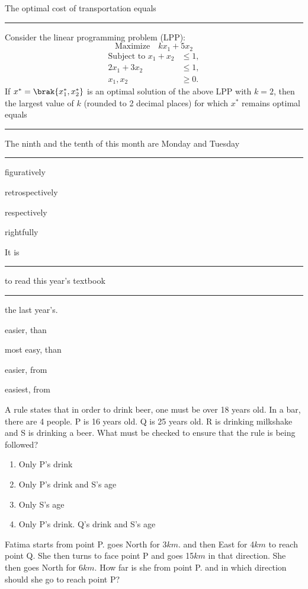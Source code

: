 The optimal cost of transportation equals \rule{2cm}{0.15mm}
\item Consider the linear programming problem (LPP):
\[
\text{Maximize} \quad kx_1 + 5x_2
\]
\[
\begin{aligned}
    \text{Subject to } x_1 + x_2 &\leq 1,\\
    2x_1 + 3x_2 &\leq 1, \\
    x_1, x_2 &\geq 0.
\end{aligned}
\]
If $x^*=\brak{x^*_1,x^*_2}$ is an optimal solution of the above LPP with $k=2$, then the largest value of $k$ (rounded to 2 decimal places) for which $x^*$ remains optimal equals \rule{2cm}{0.15mm} 
\item  The ninth and the tenth of this month are Monday and Tuesday \rule{2cm}{0.15mm}
\begin{enumerate}
\begin{multicols}{4}
\item figuratively
\item retrospectively
\item respectively
\item rightfully
\end{multicols}
\end{enumerate}
\item It is \rule{2cm}{0.15mm} to read this year's textbook \rule{2cm}{0.15mm} the last year's.
\begin{enumerate}
\begin{multicols}{4}
\item easier, than
\item most easy, than
\item easier, from
\item easiest, from
\end{multicols}
\end{enumerate}
\item A rule states that in order to drink beer, one must be over 18 years old. In a bar, there are 4 people. P is 16 years old. Q is 25 years old. R is drinking milkshake and S is drinking a beer. What must be checked to ensure that the rule is being followed?
\begin{enumerate}
\item Only P's drink
\item Only P's drink and S's age
\item Only S's age
\item Only P's drink. Q's drink and S's age
\end{enumerate}
\item Fatima starts from point P. goes North for 3$km$. and then East for 4$km$ to reach point Q. She then turns to face point P and goes 15$km$ in that direction. She then goes North for 6$km$. How far is she from point P. and in which direction should she go to reach point P?
